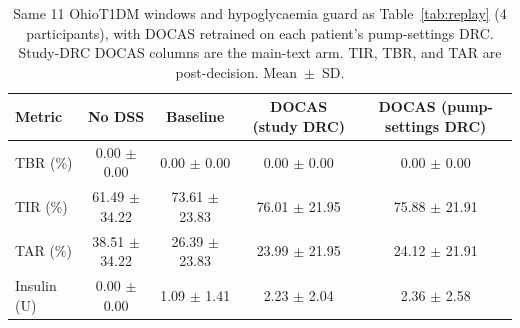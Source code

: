 \begin{table}[pos=htbp,width=0.92\linewidth]
\centering
\caption{Same 11 OhioT1DM windows and hypoglycaemia guard as Table~\ref{tab:replay} (4 participants), with DOCAS retrained on each patient's pump-settings DRC. Study-DRC DOCAS columns are the main-text arm. TIR, TBR, and TAR are post-decision. Mean~$\pm$~SD.}
\label{tab:clinical-replay}
\scriptsize
\begin{tabular}{lcccc}
\toprule
Metric & No DSS & Baseline & DOCAS (study DRC) & DOCAS (pump-settings DRC) \\
\midrule
TBR (\%) & 0.00 $\pm$ 0.00 & 0.00 $\pm$ 0.00 & 0.00 $\pm$ 0.00 & 0.00 $\pm$ 0.00 \\
TIR (\%) & 61.49 $\pm$ 34.22 & 73.61 $\pm$ 23.83 & 76.01 $\pm$ 21.95 & 75.88 $\pm$ 21.91 \\
TAR (\%) & 38.51 $\pm$ 34.22 & 26.39 $\pm$ 23.83 & 23.99 $\pm$ 21.95 & 24.12 $\pm$ 21.91 \\
Insulin (U) & 0.00 $\pm$ 0.00 & 1.09 $\pm$ 1.41 & 2.23 $\pm$ 2.04 & 2.36 $\pm$ 2.58 \\
\bottomrule
\end{tabular}
\end{table}
